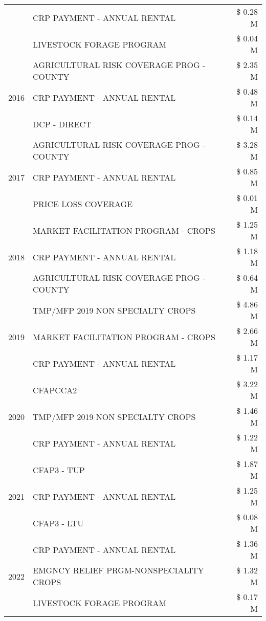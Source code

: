 \begin{tabular}{llr}
 & CRP PAYMENT - ANNUAL RENTAL & \$ 0.28 M \\
 & LIVESTOCK FORAGE PROGRAM & \$ 0.04 M \\
\cline{1-3}
\multirow[t]{3}{*}{2016} & AGRICULTURAL RISK COVERAGE PROG - COUNTY & \$ 2.35 M \\
 & CRP PAYMENT - ANNUAL RENTAL & \$ 0.48 M \\
 & DCP - DIRECT & \$ 0.14 M \\
\cline{1-3}
\multirow[t]{3}{*}{2017} & AGRICULTURAL RISK COVERAGE PROG - COUNTY & \$ 3.28 M \\
 & CRP PAYMENT - ANNUAL RENTAL & \$ 0.85 M \\
 & PRICE LOSS COVERAGE & \$ 0.01 M \\
\cline{1-3}
\multirow[t]{3}{*}{2018} & MARKET FACILITATION PROGRAM - CROPS & \$ 1.25 M \\
 & CRP PAYMENT - ANNUAL RENTAL & \$ 1.18 M \\
 & AGRICULTURAL RISK COVERAGE PROG - COUNTY & \$ 0.64 M \\
\cline{1-3}
\multirow[t]{3}{*}{2019} & TMP/MFP 2019 NON SPECIALTY CROPS & \$ 4.86 M \\
 & MARKET FACILITATION PROGRAM - CROPS & \$ 2.66 M \\
 & CRP PAYMENT - ANNUAL RENTAL & \$ 1.17 M \\
\cline{1-3}
\multirow[t]{3}{*}{2020} & CFAPCCA2 & \$ 3.22 M \\
 & TMP/MFP 2019 NON SPECIALTY CROPS & \$ 1.46 M \\
 & CRP PAYMENT - ANNUAL RENTAL & \$ 1.22 M \\
\cline{1-3}
\multirow[t]{3}{*}{2021} & CFAP3 - TUP & \$ 1.87 M \\
 & CRP PAYMENT - ANNUAL RENTAL & \$ 1.25 M \\
 & CFAP3 - LTU & \$ 0.08 M \\
\cline{1-3}
\multirow[t]{3}{*}{2022} & CRP PAYMENT - ANNUAL RENTAL & \$ 1.36 M \\
 & EMGNCY RELIEF PRGM-NONSPECIALITY CROPS & \$ 1.32 M \\
 & LIVESTOCK FORAGE PROGRAM & \$ 0.17 M \\
\cline{1-3}
\bottomrule
\end{tabular}
